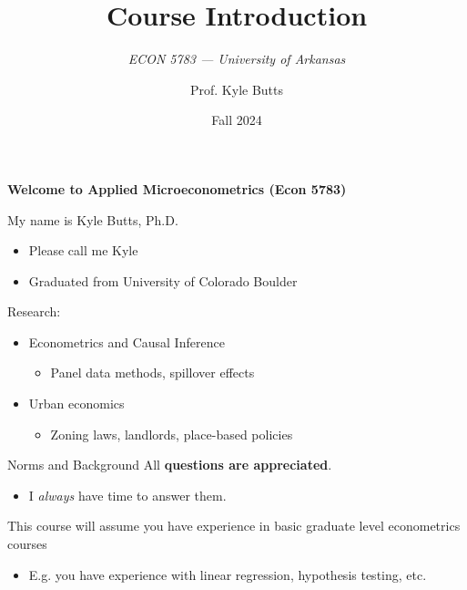 \documentclass[aspectratio=169,t,11pt,table]{beamer}
\title{Course Introduction}
\subtitle{\it  ECON 5783 — University of Arkansas}
\date{Fall 2024}
\author{Prof. Kyle Butts}
\begin{document}
\begin{frame}
\maketitle

\end{frame}

\begin{frame}{}
  \bigskip
  \begin{center}
    \alert{\Large\bf Welcome to Applied Microeconometrics (Econ 5783)}
  \end{center}

  \bigskip
  My name is Kyle Butts, Ph.D.
  \begin{itemize}
    \item Please call me Kyle
    
    \item Graduated from University of Colorado Boulder
  \end{itemize}  

  \bigskip
  Research: 
  \begin{itemize}
    \item Econometrics and Causal Inference
    \begin{itemize}
      \item Panel data methods, spillover effects
    \end{itemize}
    \item Urban economics 
    \begin{itemize}
      \item Zoning laws, landlords, place-based policies
    \end{itemize}
  \end{itemize}
\end{frame}

\begin{frame}{Norms and Background}
  All \alert{\bf questions are appreciated}. 
  \begin{itemize}
    \item I \emph{always} have time to answer them.
  \end{itemize}

  \pause
  \bigskip
  This course will assume you have experience in basic graduate level econometrics courses
  \begin{itemize}
    \item E.g. you have experience with linear regression, hypothesis testing, etc. 
  \end{itemize}
\end{frame}
\end{document}
